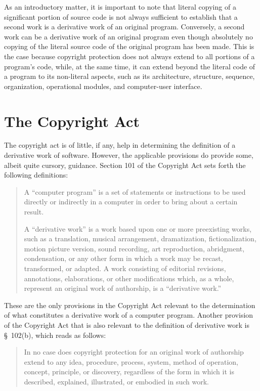 As an introductory matter, it is important to note that literal copying of
a significant portion of source code is not always sufficient to establish
that a second work is a derivative work of an original
program. Conversely, a second work can be a derivative work of an original
program even though absolutely no copying of the literal source code of
the original program has been made. This is the case because copyright
protection does not always extend to all portions of a program's code,
while, at the same time, it can extend beyond the literal code of a
program to its non-literal aspects, such as its architecture, structure,
sequence, organization, operational modules, and computer-user interface.

\section{The Copyright Act}

The copyright act is of little, if any, help in determining the definition
of a derivative work of software. However, the applicable provisions do
provide some, albeit quite cursory, guidance. Section 101 of the Copyright
Act sets forth the following definitions:

\begin{quotation}
A ``computer program'' is a set of statements or instructions to be used
directly or indirectly in a computer in order to bring about a certain
result.

A ``derivative work'' is a work based upon one or more preexisting works,
such as a translation, musical arrangement, dramatization,
fictionalization, motion picture version, sound recording, art
reproduction, abridgment, condensation, or any other form in which a work
may be recast, transformed, or adapted. A work consisting of editorial
revisions, annotations, elaborations, or other modifications which, as a
whole, represent an original work of authorship, is a ``derivative work.''
\end{quotation}

These are the only provisions in the Copyright Act relevant to the
determination of what constitutes a derivative work of a computer
program. Another provision of the Copyright Act that is also relevant to
the definition of derivative work is \S~102(b), which reads as follows:

\begin{quotation}
In no case does copyright protection for an original work of authorship
extend to any idea, procedure, process, system, method of operation,
concept, principle, or discovery, regardless of the form in which it is
described, explained, illustrated, or embodied in such work.
\end{quotation}

